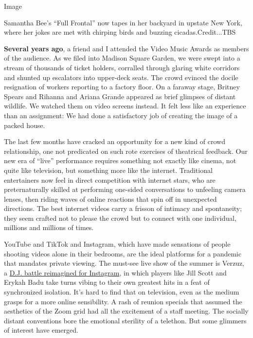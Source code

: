 Image

Samantha Bee's ``Full Frontal'' now tapes in her backyard in upstate New
York, where her jokes are met with chirping birds and buzzing
cicadas.Credit...TBS

\textbf{Several years ago}, a friend and I attended the Video Music
Awards as members of the audience. As we filed into Madison Square
Garden, we were swept into a stream of thousands of ticket holders,
corralled through glaring white corridors and shunted up escalators into
upper-deck seats. The crowd evinced the docile resignation of workers
reporting to a factory floor. On a faraway stage, Britney Spears and
Rihanna and Ariana Grande appeared as brief glimpses of distant
wildlife. We watched them on video screens instead. It felt less like an
experience than an assignment: We had done a satisfactory job of
creating the image of a packed house.

The last few months have cracked an opportunity for a new kind of crowd
relationship, one not predicated on such rote exercises of theatrical
feedback. Our new era of ``live'' performance requires something not
exactly like cinema, not quite like television, but something more like
the internet. Traditional entertainers now feel in direct competition
with internet stars, who are preternaturally skilled at performing
one-sided conversations to unfeeling camera lenses, then riding waves of
online reactions that spin off in unexpected directions. The best
internet videos carry a frisson of intimacy and spontaneity; they seem
crafted not to please the crowd but to connect with one individual,
millions and millions of times.

YouTube and TikTok and Instagram, which have made sensations of people
shooting videos alone in their bedrooms, are the ideal platforms for a
pandemic that mandates private viewing. The must-see live show of the
summer is Verzuz, a
\href{https://www.nytimes3xbfgragh.onion/2020/05/07/arts/music/hip-hop-instagram-coronavirus.html}{D.J.
battle reimagined for Instagram}, in which players like Jill Scott and
Erykah Badu take turns vibing to their own greatest hits in a feat of
synchronized isolation. It's hard to find that on television, even as
the medium grasps for a more online sensibility. A rash of reunion
specials that assumed the aesthetics of the Zoom grid had all the
excitement of a staff meeting. The socially distant conventions bore the
emotional sterility of a telethon. But some glimmers of interest have
emerged.

